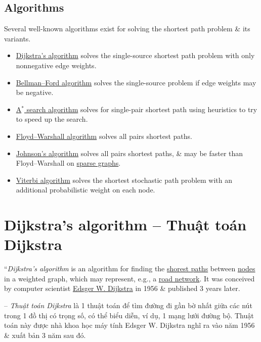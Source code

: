 \documentclass[oneside]{book}
\begin{document}
\subsection{Algorithms}
Several well-known algorithms exist for solving the shortest path problem \& its variants.
\begin{itemize}
	\item \href{https://en.wikipedia.org/wiki/Dijkstra%27s_algorithm}{Dijkstra's algorithm} solves the single-source shortest path problem with only nonnegative edge weights.
	\item \href{https://en.wikipedia.org/wiki/Bellman%E2%80%93Ford_algorithm}{Bellman--Ford algorithm} solves the single-source problem if edge weights may be negative.
	\item \href{https://en.wikipedia.org/wiki/A*_search_algorithm}{A${}^*$ search algorithm} solves for single-pair shortest path using heuristics to try to speed up the search.
	\item \href{https://en.wikipedia.org/wiki/Floyd%E2%80%93Warshall_algorithm}{Floyd--Warshall algorithm} solves all pairs shortest paths.
	\item \href{https://en.wikipedia.org/wiki/Johnson%27s_algorithm}{Johnson's algorithm} solves all pairs shortest paths, \& may be faster than Floyd--Warshall on \href{https://en.wikipedia.org/wiki/Sparse_graph}{sparse graphs}.
	\item \href{https://en.wikipedia.org/wiki/Viterbi_algorithm}{Viterbi algorithm} solves the shortest stochastic path problem with an additional probabilistic weight on each node.
\end{itemize}


\section{Dijkstra's algorithm -- Thuật toán Dijkstra}
``{\it Dijkstra's algorithm} is an algorithm for finding the \href{https://en.wikipedia.org/wiki/Shortest_path_problem}{shorest paths} between \href{https://en.wikipedia.org/wiki/Vertex_(graph_theory)}{nodes} in a weighted graph, which may represent, e.g., a \href{https://en.wikipedia.org/wiki/Road_network}{road network}. It was conceived by computer scientist \href{https://en.wikipedia.org/wiki/Edsger_W._Dijkstra}{\sc Edsger W. Dijkstra} in 1956 \& published 3 years later.

-- {\it Thuật toán Dijkstra} là 1 thuật toán để tìm đường đi gần bờ nhất giữa các nút trong 1 đồ thị có trọng số, có thể biểu diễn, ví dụ, 1 mạng lưới đường bộ. Thuật toán này được nhà khoa học máy tính {\sc Edsger W. Dijkstra} nghĩ ra vào năm 1956 \& xuất bản 3 năm sau đó.
\end{document}
